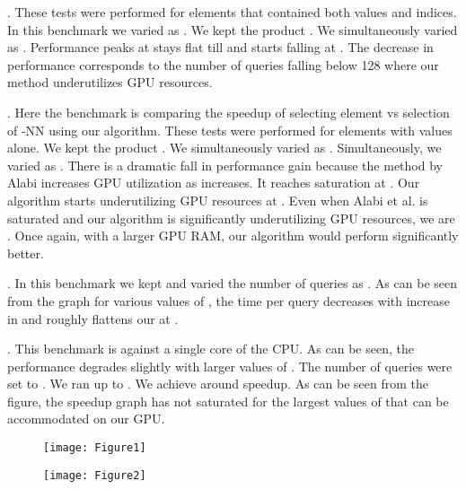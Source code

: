 \documentclass[10pt]{article}
\begin{document}
. These tests were performed for elements that contained both values and indices. In this benchmark we varied  as . We kept the product . We simultaneously varied  as . Performance peaks at   stays flat till   and starts falling at  . The decrease in performance corresponds to the number of queries  falling below 128 where our method underutilizes GPU resources. 

. Here the benchmark is comparing the speedup of selecting  element vs selection of -NN using our algorithm. These tests were performed for elements with values alone. We kept the product . We simultaneously varied  as . Simultaneously, we varied  as . There is a dramatic fall in performance gain because the method by Alabi increases GPU utilization as  increases. It reaches saturation at   \cite{Alabi:2012}. Our algorithm starts underutilizing GPU resources at . Even when Alabi et al. is saturated and our algorithm is significantly underutilizing GPU resources, we are .  Once again, with a larger GPU RAM, our algorithm would perform significantly better.

. In this benchmark we kept  and varied the number of queries as .  As can be seen from the graph for various values of , the time per query decreases with increase in  and roughly flattens our at .


.  This benchmark is against a single core of the CPU. As can be seen, the performance degrades slightly with larger values of . The number of queries were set to . We ran up to . We achieve around  speedup. As can be seen from the figure, the speedup graph has not saturated for the largest values of  that can be accommodated on our GPU. 

\newpage
\begin{figure}[!h]
\label{readin}
\begin{center}
\texttt{[image: Figure1]}
\end{center}
\caption{}
\end{figure}

\newpage
\begin{figure}[!h]
\label{pivot}
\begin{center}
\texttt{[image: Figure2]}
\end{center}
\caption{}
\end{figure}
\end{document}
